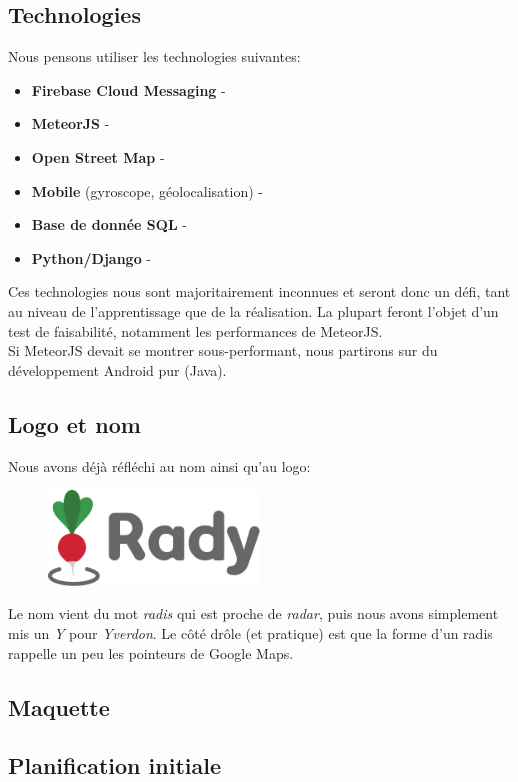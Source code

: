 \documentclass[french]{article}
\begin{document}
		\subsection{Technologies}
			Nous pensons utiliser les technologies suivantes:
			\begin{itemize}
				\item \textbf{Firebase Cloud Messaging} -
				\item \textbf{MeteorJS} -
				\item \textbf{Open Street Map} -
				\item \textbf{Mobile} (gyroscope, géolocalisation) - 
				\item \textbf{Base de donnée SQL} -
				\item \textbf{Python/Django} - \\
			\end{itemize}
		
			Ces technologies nous sont majoritairement inconnues et seront donc un défi, tant au niveau de l'apprentissage que de la réalisation. La plupart feront l'objet d'un test de faisabilité, notamment les performances de MeteorJS.\\
			
			Si MeteorJS devait se montrer sous-performant, nous partirons sur du développement Android pur (Java).
			
		\subsection{Logo et nom}
			Nous avons déjà réfléchi au nom ainsi qu'au logo:
			\begin{figure}[H]
				\centering
				\includegraphics[width=0.5\textwidth]{../logo/logo}
			\end{figure}
			Le nom vient du mot \textit{radis} qui est proche de \textit{radar}, puis nous avons simplement mis un \textit{Y} pour \textit{Yverdon}. Le côté drôle (et pratique) est que la forme d'un radis rappelle un peu les pointeurs de Google Maps.
		
		\subsection{Maquette}
		
		\subsection{Planification initiale}
	
\end{document}
